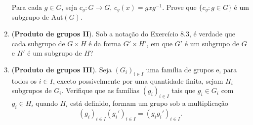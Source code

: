 \documentclass[a4paper,12pt]{article}
\begin{document}
\begin{enumerate}[label=9.\arabic*.]
    Para cada $g \in G$, seja $c_g : G \to G$, $c_g(x) = gxg^{-1}$. Prove que $\{c_g : g \in G\}$ é um subgrupo de $\text{Aut}(G)$. 

    \item (\textbf{Produto de grupos II}). Sob a notação do Exercício 8.3, é verdade que cada subgrupo de $G \times H$ é da forma $G' \times H'$, em que $G'$ é um subgrupo de $G$ e $H'$ é um subgrupo de $H$? 

    \item (\textbf{Produto de grupos III}). Seja $(G_i)_{i \in I}$ uma família de grupos e, para todos os $i \in I$, exceto possivelmente por uma quantidade finita, sejam $H_i$ subgrupos de $G_i$. Verifique que as famílias $(g_i)_{i \in I}$ tais que $g_i \in G_i$ com $g_i \in H_i$ quando $H_i$ está definido, formam um grupo sob a multiplicação 
    \[
    (g_i)_{i \in I} (g_i')_{i \in I} = (g_ig_i')_{i \in I}.
    \] 

\end{enumerate}
\end{document}
